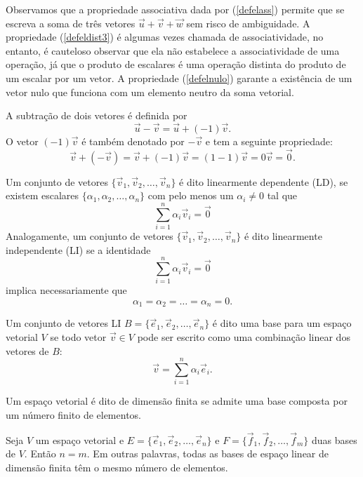 \begin{obs}Observamos que a propriedade associativa dada por (\ref{defelass}) permite que se escreva a soma de três vetores $\vec{u}+\vec{v}+\vec{w}$ sem risco de ambiguidade. A propriedade (\ref{defeldist3}) é algumas vezes chamada de associatividade, no entanto, é cauteloso observar que ela não estabelece a associatividade de uma operação, já que o produto de escalares é uma operação distinta do produto de um escalar por um vetor. A propriedade (\ref{defelnulo}) garante a existência de um vetor nulo que funciona com um elemento neutro da soma vetorial. \end{obs}

A subtração de dois vetores é definida por
\begin{equation}\label{delsub}
\vec{u}-\vec{v}=\vec{u}+ (-1) \vec{v}.
\end{equation}
O vetor $(-1) \vec{v}$ é também denotado por $-\vec{v}$ e tem a seguinte propriedade:
\begin{equation}\label{delinvad}
\vec{v}+(-\vec{v})=\vec{v}+(-1) \vec{v} = (1-1)\vec{v}=0\vec{v}=\vec{0}.
\end{equation}

Um conjunto de vetores $\{\vec{v}_1, \vec{v}_2,\ldots, \vec{v}_n\}$ é dito linearmente dependente (LD), se existem escalares $\{\alpha_1,\alpha_2,\ldots, \alpha_n\}$ com pelo menos um $\alpha_i\neq 0$ tal que
$$\sum_{i=1}^n\alpha_i \vec{v}_i=\vec{0}$$
Analogamente, um conjunto de vetores $\{\vec{v}_1, \vec{v}_2,\ldots, \vec{v}_n\}$ é dito linearmente independente (LI) se a identidade
$$\sum_{i=1}^n\alpha_i \vec{v}_i=\vec{0}$$
implica necessariamente que
$$\alpha_1=\alpha_2=\ldots=\alpha_n=0.$$

Um conjunto de vetores LI $B=\{\vec{e}_1, \vec{e}_2,\ldots, \vec{e}_n\}$ é dito uma base para um espaço vetorial $V$ se todo vetor $\vec{v}\in V$ pode ser escrito como uma combinação linear dos vetores de $B$:
$$\vec{v}=\sum_{i=1}^n \alpha_i \vec{e}_i.$$

Um espaço vetorial é dito de dimensão finita se admite uma base composta por um número finito de elementos.

\begin{teo}\label{teo_dim} Seja $V$ um espaço vetorial e $E=\{\vec{e}_1, \vec{e}_2,\ldots, \vec{e}_n\}$ e $F=\{\vec{f}_1, \vec{f}_2,\ldots, \vec{f}_m\}$ duas bases de $V$. Então $n=m$. Em outras palavras, todas as bases de espaço linear de dimensão finita têm o mesmo número de elementos.
 \end{teo}

